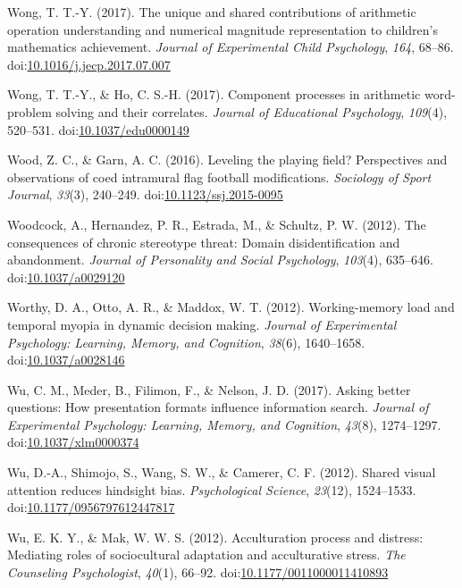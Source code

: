\documentclass[english,man]{apa6}
\theoremstyle{definition}
\theoremstyle{definition}
\theoremstyle{definition}
\theoremstyle{remark}
\begin{document}
\hypertarget{ref-Wong2017}{}
Wong, T. T.-Y. (2017). The unique and shared contributions of arithmetic
operation understanding and numerical magnitude representation to
children's mathematics achievement. \emph{Journal of Experimental Child
Psychology}, \emph{164}, 68--86.
doi:\href{https://doi.org/10.1016/j.jecp.2017.07.007}{10.1016/j.jecp.2017.07.007}

\hypertarget{ref-Wong2017a}{}
Wong, T. T.-Y., \& Ho, C. S.-H. (2017). Component processes in
arithmetic word-problem solving and their correlates. \emph{Journal of
Educational Psychology}, \emph{109}(4), 520--531.
doi:\href{https://doi.org/10.1037/edu0000149}{10.1037/edu0000149}

\hypertarget{ref-Wood2016}{}
Wood, Z. C., \& Garn, A. C. (2016). Leveling the playing field?
Perspectives and observations of coed intramural flag football
modifications. \emph{Sociology of Sport Journal}, \emph{33}(3),
240--249.
doi:\href{https://doi.org/10.1123/ssj.2015-0095}{10.1123/ssj.2015-0095}

\hypertarget{ref-Woodcock}{}
Woodcock, A., Hernandez, P. R., Estrada, M., \& Schultz, P. W. (2012).
The consequences of chronic stereotype threat: Domain disidentification
and abandonment. \emph{Journal of Personality and Social Psychology},
\emph{103}(4), 635--646.
doi:\href{https://doi.org/10.1037/a0029120}{10.1037/a0029120}

\hypertarget{ref-Worthy2012}{}
Worthy, D. A., Otto, A. R., \& Maddox, W. T. (2012). Working-memory load
and temporal myopia in dynamic decision making. \emph{Journal of
Experimental Psychology: Learning, Memory, and Cognition}, \emph{38}(6),
1640--1658.
doi:\href{https://doi.org/10.1037/a0028146}{10.1037/a0028146}

\hypertarget{ref-Wu2016}{}
Wu, C. M., Meder, B., Filimon, F., \& Nelson, J. D. (2017). Asking
better questions: How presentation formats influence information search.
\emph{Journal of Experimental Psychology: Learning, Memory, and
Cognition}, \emph{43}(8), 1274--1297.
doi:\href{https://doi.org/10.1037/xlm0000374}{10.1037/xlm0000374}

\hypertarget{ref-Wu2012a}{}
Wu, D.-A., Shimojo, S., Wang, S. W., \& Camerer, C. F. (2012). Shared
visual attention reduces hindsight bias. \emph{Psychological Science},
\emph{23}(12), 1524--1533.
doi:\href{https://doi.org/10.1177/0956797612447817}{10.1177/0956797612447817}

\hypertarget{ref-Wu2012}{}
Wu, E. K. Y., \& Mak, W. W. S. (2012). Acculturation process and
distress: Mediating roles of sociocultural adaptation and acculturative
stress. \emph{The Counseling Psychologist}, \emph{40}(1), 66--92.
doi:\href{https://doi.org/10.1177/0011000011410893}{10.1177/0011000011410893}
\end{document}
